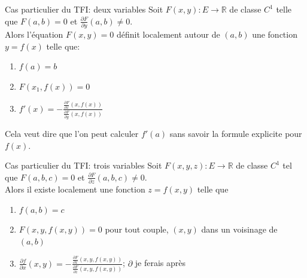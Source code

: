 \begin{parag}{Cas particulier du TFI: deux variables}
    Soit $F\left(x, y\right): E \to \mathbb{R}$ de classe $C^1$ telle que $F\left(a,b\right) = 0$ et $\frac{\partial F}{\partial y}\left(a, b\right) \neq 0$.\\
    Alors l'équation $F\left(x, y\right) = 0$ définit localement autour de $\left(a, b\right)$ une fonction $y = f\left(x\right) $ telle que:
    \begin{enumerate}
        \item $f\left(a\right) = b$
        \item $F\left(x_1, f\left(x\right)\right) = 0$
        \item $f'\left(x\right) = - \frac{\frac{\partial F}{\partial x}\left(x, f\left(x\right)\right)}{\frac{\partial F}{\partial y}\left(x, f\left(x\right)\right)}$
    \end{enumerate}
    Cela veut dire que l'on peut calculer $f'\left(a\right)$ sans savoir la formule explicite pour $f\left(x\right)$.
    
\end{parag}

\begin{parag}{Cas particulier du TFI: trois variables}
    Soit $F\left(x, y, z\right): E \to \mathbb{R}$ de classe $C^{1}$ tel que $F\left(a,b, c\right) = 0$ et $\frac{\partial F}{\partial z}\left(a, b, c\right) \neq 0$.\\
    Alors il existe localement une fonction $z = f\left(x, y\right)$ telle que 
    \begin{enumerate}
        \item $f\left(a, b\right) = c$
        \item $F\left(x, y, f\left(x, y\right)\right) = 0$ pour tout couple, $\left(x, y\right)$ dans un voisinage de $\left(a, b\right)$
        \item $\frac{\partial f}{\partial x}\left(x, y\right) = - \frac{\frac{\partial F}{\partial x}\left(x, y, f\left(x, y\right)\right)}{\frac{\partial F}{\partial z}\left(x, y, f\left(x, y\right)\right)}$; $\partial $ je ferais après
        
    \end{enumerate}
    
    
\end{parag}

